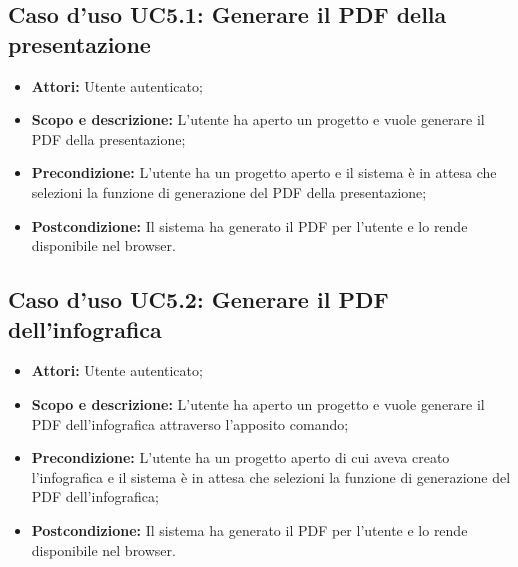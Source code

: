 	\subsection{Caso d'uso UC5.1: Generare il PDF della presentazione}
	\begin{itemize}
		\item \textbf{Attori:} Utente autenticato;
		\item \textbf{Scopo e descrizione:} L'utente ha aperto un progetto e vuole generare il PDF della presentazione;
		\item \textbf{Precondizione:} L'utente ha un progetto aperto e il sistema è in attesa che selezioni la funzione di generazione del PDF della presentazione;
		\item \textbf{Postcondizione:} Il sistema ha generato il PDF per l'utente e lo rende disponibile nel \gls{browser}.
	\end{itemize}
	
	\subsection{Caso d'uso UC5.2: Generare il PDF dell'infografica}
	\begin{itemize}
		\item \textbf{Attori:} Utente autenticato;
		\item \textbf{Scopo e descrizione:} L'utente ha aperto un progetto e vuole generare il PDF dell'\gls{infografica} attraverso l'apposito comando;
		\item \textbf{Precondizione:} L'utente ha un progetto aperto di cui aveva creato l'\gls{infografica} e il sistema è in attesa che selezioni la funzione di generazione del PDF dell'\gls{infografica};
		\item \textbf{Postcondizione:} Il sistema ha generato il PDF per l'utente e lo rende disponibile nel \gls{browser}.
	\end{itemize}

